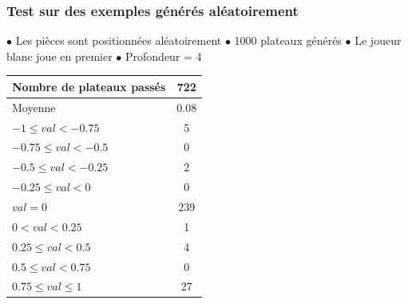 \documentclass[11pt]{beamer}
\begin{document}
\begin{frame}
	
	\frametitle{Test sur des exemples générés aléatoirement}
	$\bullet $ Les pièces sont positionnées aléatoirement \newline
	$\bullet$ 1000 plateaux générés \newline
	$\bullet $ Le joueur blanc joue en premier \newline
	$\bullet $ Profondeur = 4
	\begin{center}
		
		\begin{tabular}{ | l | c | }
			\hline
			Nombre de plateaux passés & 722 \\ \hline
			Moyenne & 0.08 \\ \hline
			$-1 \leq val < -0.75$ & 5  \\ \hline
			$-0.75 \leq val < -0.5$ & 0  \\ \hline
			$-0.5 \leq val < -0.25$ & 2  \\ \hline
			$-0.25 \leq val < 0$ & 0 \\ \hline
			$val = 0 $   & 239  \\ \hline
			$0 < val < 0.25$ & 1  \\ \hline
			$0.25 \leq val < 0.5$ & 4  \\ \hline
			$0.5 \leq val < 0.75$ & 0  \\ \hline
			$0.75 \leq val \leq 1$ & 27  \\
			\hline
		\end{tabular}
	\end{center}	
\end{frame}
\end{document}
